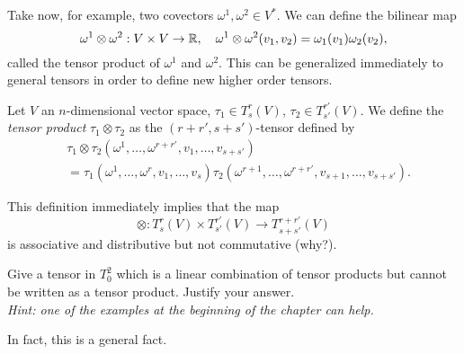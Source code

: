 Take now, for example, two covectors $\omega^1, \omega^2 \in V^*$. We can define the bilinear map
\begin{equation}
  \omega^1\otimes \omega^2 : V\times V \to \mathbb{R},\quad
  \omega^1\otimes \omega^2(v_1, v_2) = \omega_1(v_1)\omega_2(v_2),
\end{equation}
called the tensor product of $\omega^1$ and $\omega^2$.
This can be generalized immediately to general tensors in order to define new higher order tensors.

\begin{definition}
  Let $V$ an $n$-dimensional vector space, $\tau_1\in T_s^r(V)$, $\tau_2\in T_{s'}^{r'}(V)$.
  We define the \emph{tensor product} $\tau_1\otimes\tau_2$ as the $(r+r', s+s')$-tensor defined by
  \begin{align}
    &\tau_1\otimes\tau_2(\omega^1,\ldots,\omega^{r+r'}, v_1,\ldots,v_{s+s'}) \\
    &= \tau_1(\omega^1,\ldots,\omega^{r}, v_1,\ldots,v_{s}) \tau_2(\omega^{r+1},\ldots,\omega^{r+r'}, v_{s+1},\ldots,v_{s+s'}).
  \end{align}
\end{definition}

This definition immediately implies that the map
\begin{equation}
  \otimes :  T_s^r(V)\times T_{s'}^{r'}(V) \to T_{s+s'}^{r+r'}(V)
\end{equation}
is associative and distributive but not commutative (why?).

\begin{exercise}
  Give a tensor in $T^2_0$ which is a linear combination of tensor products but cannot be written as a tensor product.
  Justify your answer.\\
 \textit{\small Hint: one of the examples at the beginning of the chapter can help.}
\end{exercise}

In fact, this is a general fact.

